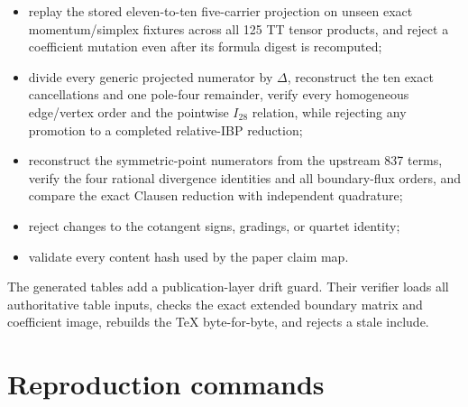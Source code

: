 \documentclass[11pt]{article}
\theoremstyle{definition}
\theoremstyle{remark}
\begin{document}
\begin{itemize}
fourth-order first replacement error in the scalar-flat $K$--Ricci crosswalk,
while rejecting promotion of normalization alone to a five-carrier projection;
\item replay the stored eleven-to-ten five-carrier projection on unseen exact
momentum/simplex fixtures across all 125 TT tensor products, and reject a
coefficient mutation even after its formula digest is recomputed;
\item divide every generic projected numerator by $\Delta$, reconstruct the
ten exact cancellations and one pole-four remainder, verify every homogeneous
edge/vertex order and the pointwise $I_{28}$ relation, while rejecting any
promotion to a completed relative-IBP reduction;
\item reconstruct the symmetric-point numerators from the upstream 837 terms,
verify the four rational divergence identities and all boundary-flux orders,
and compare the exact Clausen reduction with independent quadrature;
\item reject changes to the cotangent signs, gradings, or quartet identity;
\item validate every content hash used by the paper claim map.
\end{itemize}

The generated tables add a publication-layer drift guard.  Their verifier
loads all authoritative table inputs, checks the exact extended boundary
matrix and coefficient image, rebuilds the TeX byte-for-byte, and rejects a
stale include.

\section{Reproduction commands}
\end{document}
